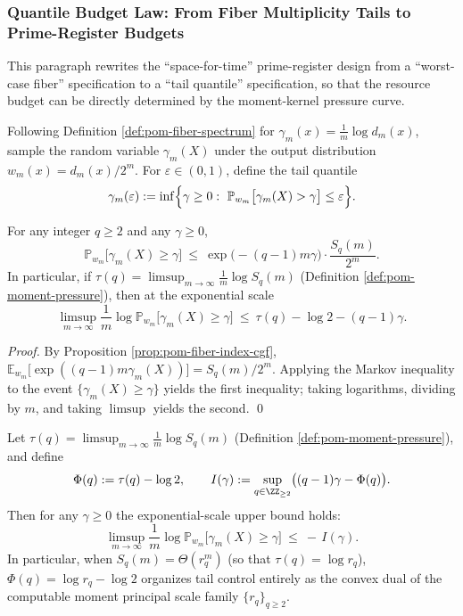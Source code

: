 \subsubsection{Quantile Budget Law: From Fiber Multiplicity Tails to Prime-Register Budgets}\label{subsec:pom-quantile-budget-law}

This paragraph rewrites the ``space-for-time'' prime-register design from a ``worst-case fiber'' specification to a ``tail quantile'' specification, so that the resource budget can be directly determined by the moment-kernel pressure curve.

\begin{definition}\label{def:pom-gamma-quantile}
Following Definition \ref{def:pom-fiber-spectrum} for \(\gamma_m(x)=\frac{1}{m}\log d_m(x)\), sample the random variable \(\gamma_m(X)\) under the output distribution \(w_m(x)=d_m(x)/2^m\).
For \(\varepsilon\in(0,1)\), define the tail quantile
$$
\gamma_{m}(\varepsilon):=\inf\Bigl\{\gamma\ge 0:\ \mathbb{P}_{w_m}\big[\gamma_m(X)>\gamma\big]\le \varepsilon\Bigr\}.
$$
\end{definition}

\begin{proposition}\label{prop:pom-quantile-chernoff}
For any integer \(q\ge 2\) and any \(\gamma\ge 0\),
$$
\mathbb{P}_{w_m}\big[\gamma_m(X)\ge \gamma\big]
\ \le\
\exp\!\bigl(-(q-1)m\gamma\bigr)\cdot \frac{S_q(m)}{2^m}.
$$
In particular, if \(\tau(q)=\limsup_{m\to\infty}\frac{1}{m}\log S_q(m)\) (Definition \ref{def:pom-moment-pressure}), then at the exponential scale
$$
\limsup_{m\to\infty}\frac{1}{m}\log \mathbb{P}_{w_m}\big[\gamma_m(X)\ge \gamma\big]
\ \le\
\tau(q)-\log 2-(q-1)\gamma.
$$
\end{proposition}

\begin{proof}
By Proposition \ref{prop:pom-fiber-index-cgf},
\(
\mathbb{E}_{w_m}\big[\exp((q-1)m\gamma_m(X))\big]=S_q(m)/2^m
\).
Applying the Markov inequality to the event \(\{\gamma_m(X)\ge\gamma\}\) yields the first inequality; taking logarithms, dividing by \(m\), and taking \(\limsup\) yields the second. \qed
\end{proof}

\begin{corollary}\label{cor:pom-quantile-dual-optimizer}
Let \(\tau(q)=\limsup_{m\to\infty}\frac{1}{m}\log S_q(m)\) (Definition \ref{def:pom-moment-pressure}), and define
\[
\Phi(q):=\tau(q)-\log 2,
\qquad
I(\gamma):=\sup_{q\in\ZZ_{\ge 2}}\bigl((q-1)\gamma-\Phi(q)\bigr).
\]
Then for any \(\gamma\ge 0\) the exponential-scale upper bound holds:
\[
\limsup_{m\to\infty}\frac{1}{m}\log \mathbb{P}_{w_m}\big[\gamma_m(X)\ge \gamma\big]
\ \le\ -\,I(\gamma).
\]
In particular, when \(S_q(m)=\Theta(r_q^m)\) (so that \(\tau(q)=\log r_q\)),
\(
\Phi(q)=\log r_q-\log 2
\)
organizes tail control entirely as the convex dual of the computable moment principal scale family \(\{r_q\}_{q\ge 2}\).
\end{corollary}


